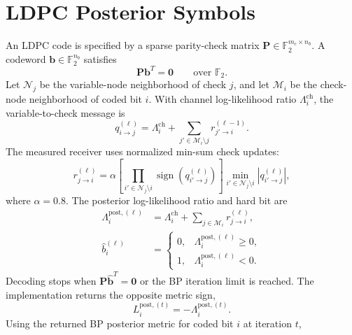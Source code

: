 \documentclass[conference]{IEEEtran}
\newcommand{\Ftwo}{\mathbb{F}_2}
\begin{document}
\section{LDPC Posterior Symbols}

An LDPC code is specified by a sparse parity-check matrix
\(\mathbf P\in\Ftwo^{m_c\times n_b}\).  A codeword
\(\mathbf b\in\Ftwo^{n_b}\) satisfies
\begin{equation}
  \mathbf P\mathbf b^T=\mathbf 0
  \qquad\text{over }\Ftwo .
  \label{eq:parity}
\end{equation}
Let \(\mathcal N_j\) be the variable-node neighborhood of check \(j\), and let
\(\mathcal M_i\) be the check-node neighborhood of coded bit \(i\).  With
channel log-likelihood ratio \(\Lambda_i^{\mathrm{ch}}\), the variable-to-check
message is
\begin{equation}
  q_{i\rightarrow j}^{(\ell)}
  =
  \Lambda_i^{\mathrm{ch}}
  +
  \sum_{j'\in\mathcal M_i\setminus j}
  r_{j'\rightarrow i}^{(\ell-1)}.
  \label{eq:variable-message}
\end{equation}
The measured receiver uses normalized min-sum check updates:
\begin{equation}
  r_{j\rightarrow i}^{(\ell)}
  =
  \alpha
  \left[
  \prod_{i'\in\mathcal N_j\setminus i}
  \operatorname{sign}
  \left(q_{i'\rightarrow j}^{(\ell)}\right)
  \right]
  \min_{i'\in\mathcal N_j\setminus i}
  \left|q_{i'\rightarrow j}^{(\ell)}\right|,
  \label{eq:check-message}
\end{equation}
where \(\alpha=0.8\).  The posterior log-likelihood ratio and hard bit are
\begin{align}
  \Lambda_i^{\mathrm{post},(\ell)}
  &=
  \Lambda_i^{\mathrm{ch}}
  +
  \sum_{j\in\mathcal M_i}
  r_{j\rightarrow i}^{(\ell)},
  \label{eq:posterior-llr}\\
  \widehat b_i^{(\ell)}
  &=
  \begin{cases}
    0, & \Lambda_i^{\mathrm{post},(\ell)}\geq0,\\
    1, & \Lambda_i^{\mathrm{post},(\ell)}<0.
  \end{cases}
  \label{eq:hard-bit}
\end{align}
Decoding stops when \(\mathbf P\widehat{\mathbf b}^{T}=\mathbf0\) or the BP
iteration limit is reached.  The implementation returns the opposite metric
sign,
\begin{equation}
  L_i^{\mathrm{post},(t)}
  =
  -\Lambda_i^{\mathrm{post},(t)}.
  \label{eq:returned-posterior}
\end{equation}
Using the returned BP posterior metric for coded bit \(i\) at iteration \(t\),
\end{document}
